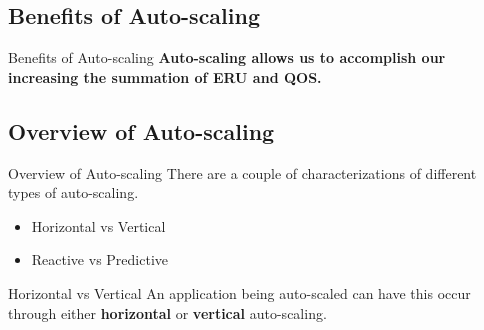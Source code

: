\documentclass{beamer}
\begin{document}

\subsection{Benefits of Auto-scaling}

\begin{frame}{Benefits of Auto-scaling}
  \textbf{Auto-scaling allows us to accomplish our increasing the summation of
  ERU and QOS.}


\end{frame}

\subsection{Overview of Auto-scaling}

\begin{frame}{Overview of Auto-scaling}
  There are a couple of characterizations of different types of auto-scaling.

  \begin{itemize}
    \item Horizontal vs Vertical
    \item Reactive vs Predictive
  \end{itemize}
\end{frame}

\begin{frame}{Horizontal vs Vertical}
  An application being auto-scaled can have this occur through either
  \textbf{horizontal} or \textbf{vertical} auto-scaling.

\end{frame}
\end{document}
